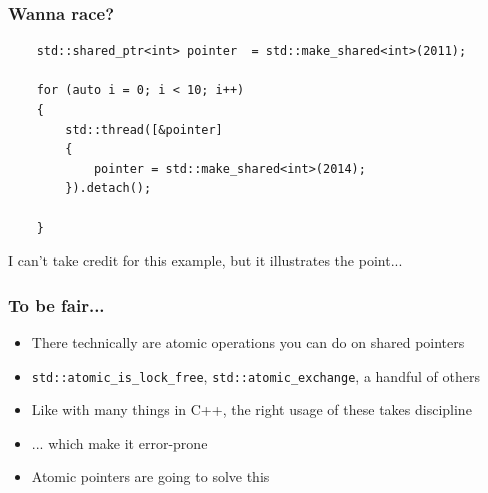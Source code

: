 \documentclass{beamer}
\begin{document}
\begin{frame}[fragile]
\frametitle{Wanna race?}

\begin{lstlisting}
    std::shared_ptr<int> pointer  = std::make_shared<int>(2011);
    
    for (auto i = 0; i < 10; i++)
    {
    	std::thread([&pointer]
    	{
    		pointer = std::make_shared<int>(2014);
    	}).detach();
    
    }
\end{lstlisting}

I can't take credit for this example, but it illustrates the point...

\end{frame}

\begin{frame}
\frametitle{To be fair...}
\begin{itemize}
\setlength\itemsep{2em}
\item There technically are atomic operations you can do on shared pointers
\item \texttt{std::atomic\_is\_lock\_free}, \texttt{std::atomic\_exchange}, a handful of others
\item Like with many things in C++, the right usage of these takes discipline
\item ... which make it error-prone
\item Atomic pointers are going to solve this
\end{itemize}
\end{frame}
\end{document}
